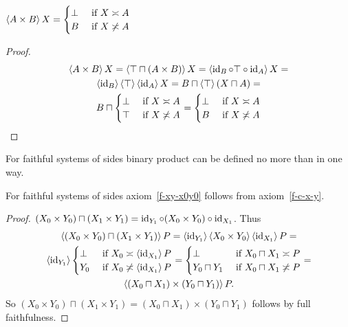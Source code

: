 \begin{prop}
$\left\langle A\times B\right\rangle X = \begin{cases}\bot&\text{ if }X\asymp A\\B&\text{ if }X\not\asymp A\end{cases}$
\end{prop}

\begin{proof}
~
\begin{multline*}
\left\langle A\times B\right\rangle X = \left\langle \top\sqcap(A\times B)\right\rangle X = \left\langle \operatorname{id}_B\circ\top\circ\operatorname{id}_A\right\rangle X = \\
\left\langle \operatorname{id}_B\right\rangle\left\langle \top\right\rangle\left\langle \operatorname{id}_A\right\rangle X =
B\sqcap\left\langle \top\right\rangle(X\sqcap A) = \\
B\sqcap\begin{cases}\bot&\text{ if }X\asymp A\\\top&\text{ if }X\not\asymp A\end{cases} =
\begin{cases}\bot&\text{ if }X\asymp A\\B&\text{ if }X\not\asymp A\end{cases}
\end{multline*}
\end{proof}

\begin{cor}
For faithful systems of sides binary product can be defined no more than in one way.
\end{cor}

\begin{prop}
For faithful systems of sides axiom~\ref{f-xy-x0y0} follows from axiom~\ref{f-c-x-y}.
\end{prop}

\begin{proof}
$(X_0\times Y_0)\sqcap(X_1\times Y_1) = \operatorname{id}_{Y_1}\circ(X_0\times Y_0)\circ\operatorname{id}_{X_1}$.
Thus
\begin{multline*}
\left\langle (X_0\times Y_0)\sqcap(X_1\times Y_1)\right\rangle P = \left\langle \operatorname{id}_{Y_1}\right\rangle\left\langle X_0\times Y_0\right\rangle\left\langle \operatorname{id}_{X_1}\right\rangle P = \\
\left\langle \operatorname{id}_{Y_1}\right\rangle\begin{cases}\bot&\text{ if }X_0\asymp\left\langle \operatorname{id}_{X_1}\right\rangle P\\Y_0&\text{ if }X_0\not\asymp\left\langle \operatorname{id}_{X_1}\right\rangle P\end{cases} =
\begin{cases}\bot&\text{ if }X_0\sqcap X_1\asymp P\\Y_0\sqcap Y_1&\text{ if }X_0\sqcap X_1\not\asymp P\end{cases} = \\
\left\langle (X_0\sqcap X_1)\times(Y_0\sqcap Y_1)\right\rangle P.
\end{multline*}
So $(X_0\times Y_0)\sqcap(X_1\times Y_1) = (X_0\sqcap X_1)\times(Y_0\sqcap Y_1)$ follows by full faithfulness.
\end{proof}

